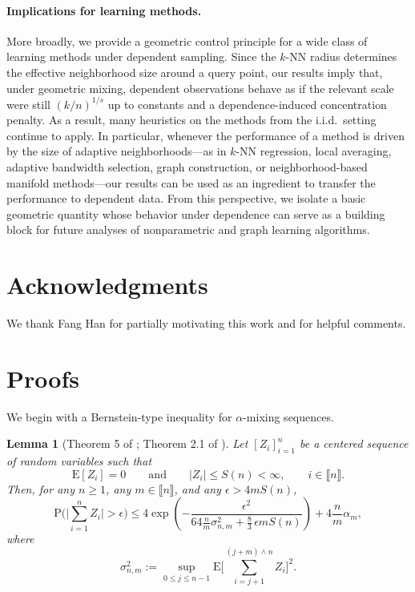 \documentclass[12pt]{article}
\def\P{{\mathrm P}}
\def\E{{\mathrm E}}
\newcommand{\zahl}[1]{\llbracket #1\rrbracket}
\newtheorem{lemma}{Lemma}
\theoremstyle{definition}
\begin{document}
\paragraph*{Implications for learning methods.}
More broadly, we provide a geometric control principle for a wide class of learning methods under dependent sampling. Since the $k$-NN radius determines the effective neighborhood size around a query point, our results imply that, under geometric mixing, dependent observations behave as if the relevant scale were still $(k/n)^{1/s}$ up to constants and a dependence-induced concentration penalty. As a result, many heuristics on the methods from the i.i.d.\ setting continue to apply. In particular, whenever the performance of a method is driven by the size of adaptive neighborhoods---as in $k$-NN regression, local averaging, adaptive bandwidth selection, graph construction, or neighborhood-based manifold methods---our results can be used as an ingredient to transfer the performance to dependent data. From this perspective, we isolate a basic geometric quantity whose behavior under dependence can serve as a building block for future analyses of nonparametric and graph learning algorithms.

\section*{Acknowledgments}
We thank Fang Han for partially motivating this work and for helpful comments.


{%


}

\newpage
\appendix

\section{Proofs}

We begin with a Bernstein-type inequality for \(\alpha\)-mixing sequences.

\begin{lemma}[Theorem 5 of \cite{rio1995functional}; Theorem 2.1 of \cite{liebscher1996strong}]\label{lemma1}
Let \([Z_i]_{i=1}^n\) be a centered sequence of random variables such that
\[
\E[Z_i]=0
\qquad\text{and}\qquad
|Z_i|\le S(n)<\infty,
\qquad i\in \zahl{n}.
\]
Then, for any \(n\ge 1\), any \(m\in \zahl{n}\), and any \(\epsilon>4mS(n)\),
\[
\P\Big(\Big|\sum_{i=1}^n Z_i\Big|>\epsilon\Big)
\le
4\exp \left(
-\frac{\epsilon^2}{64\frac{n}{m}\sigma_{n,m}^2+\frac83\,\epsilon m S(n)}
\right)
+
4\frac{n}{m}\alpha_m,
\]
where
\[
\sigma_{n,m}^2
:=
\sup_{0\le j\le n-1}
\E\Big[\sum_{i=j+1}^{(j+m)\wedge n} Z_i\Big]^2.
\]
\end{lemma}
\end{document}
